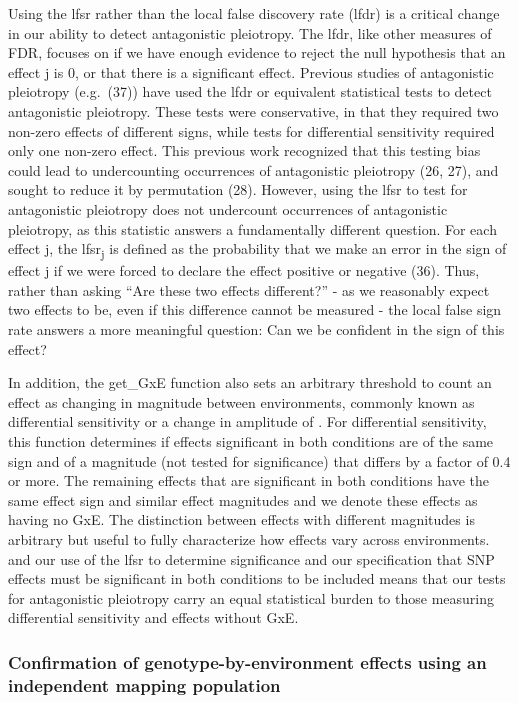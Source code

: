 \documentclass[
  9pt,
  twocolumn,
  twoside]{pnas-new}
\begin{document}
Using the lfsr rather than the local false discovery rate (lfdr) is a
critical change in our ability to detect antagonistic pleiotropy. The
lfdr, like other measures of FDR, focuses on if we have enough evidence
to reject the null hypothesis that an effect j is 0, or that there is a
significant effect. Previous studies of antagonistic pleiotropy
(e.g.~(37)) have used the lfdr or equivalent statistical tests to detect
antagonistic pleiotropy. These tests were conservative, in that they
required two non-zero effects of different signs, while tests for
differential sensitivity required only one non-zero effect. This
previous work recognized that this testing bias could lead to
undercounting occurrences of antagonistic pleiotropy (26, 27), and
sought to reduce it by permutation (28). However, using the lfsr to test
for antagonistic pleiotropy does not undercount occurrences of
antagonistic pleiotropy, as this statistic answers a fundamentally
different question. For each effect j, the lfsr\textsubscript{j} is
defined as the probability that we make an error in the sign of effect j
if we were forced to declare the effect positive or negative (36). Thus,
rather than asking ``Are these two effects different?'' - as we
reasonably expect two effects to be, even if this difference cannot be
measured - the local false sign rate answers a more meaningful question:
Can we be confident in the sign of this effect?

In addition, the get\_GxE function also sets an arbitrary threshold to
count an effect as changing in magnitude between environments, commonly
known as differential sensitivity or a change in amplitude of . For
differential sensitivity, this function determines if effects
significant in both conditions are of the same sign and of a magnitude
(not tested for significance) that differs by a factor of 0.4 or more.
The remaining effects that are significant in both conditions have the
same effect sign and similar effect magnitudes and we denote these
effects as having no GxE. The distinction between effects with different
magnitudes is arbitrary but useful to fully characterize how effects
vary across environments. and our use of the lfsr to determine
significance and our specification that SNP effects must be significant
in both conditions to be included means that our tests for antagonistic
pleiotropy carry an equal statistical burden to those measuring
differential sensitivity and effects without GxE.

\subsubsection{Confirmation of genotype-by-environment effects using an
independent mapping
population}\label{confirmation-of-genotype-by-environment-effects-using-an-independent-mapping-population}
\end{document}
